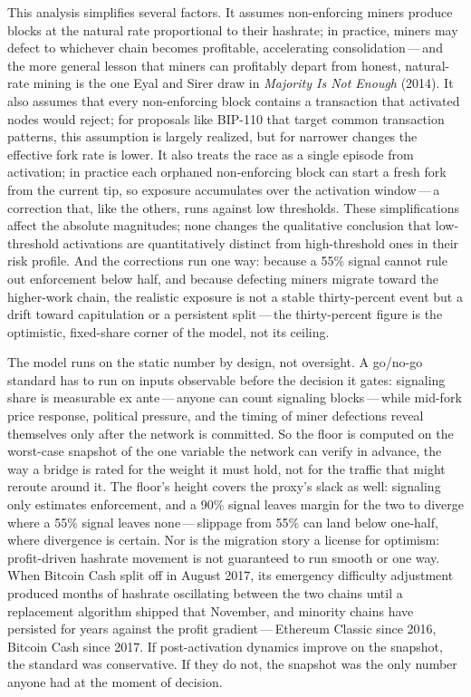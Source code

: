 \documentclass[11pt, twoside, openright]{book}
\begin{document}
This analysis simplifies several factors. It assumes non-enforcing miners produce blocks at the natural rate proportional to their hashrate; in practice, miners may defect to whichever chain becomes profitable, accelerating consolidation\,---\,and the more general lesson that miners can profitably depart from honest, natural-rate mining is the one Eyal and Sirer draw in \textit{Majority Is Not Enough} (2014). It also assumes that every non-enforcing block contains a transaction that activated nodes would reject; for proposals like BIP-110 that target common transaction patterns, this assumption is largely realized, but for narrower changes the effective fork rate is lower. It also treats the race as a single episode from activation; in practice each orphaned non-enforcing block can start a fresh fork from the current tip, so exposure accumulates over the activation window\,---\,a correction that, like the others, runs against low thresholds. These simplifications affect the absolute magnitudes; none changes the qualitative conclusion that low-threshold activations are quantitatively distinct from high-threshold ones in their risk profile. And the corrections run one way: because a 55\% signal cannot rule out enforcement below half, and because defecting miners migrate toward the higher-work chain, the realistic exposure is not a stable thirty-percent event but a drift toward capitulation or a persistent split\,---\,the thirty-percent figure is the optimistic, fixed-share corner of the model, not its ceiling.

The model runs on the static number by design, not oversight. A go/no-go standard has to run on inputs observable before the decision it gates: signaling share is measurable ex ante\,---\,anyone can count signaling blocks\,---\,while mid-fork price response, political pressure, and the timing of miner defections reveal themselves only after the network is committed. So the floor is computed on the worst-case snapshot of the one variable the network can verify in advance, the way a bridge is rated for the weight it must hold, not for the traffic that might reroute around it. The floor's height covers the proxy's slack as well: signaling only estimates enforcement, and a 90\% signal leaves margin for the two to diverge where a 55\% signal leaves none\,---\,slippage from 55\% can land below one-half, where divergence is certain. Nor is the migration story a license for optimism: profit-driven hashrate movement is not guaranteed to run smooth or one way. When Bitcoin Cash split off in August 2017, its emergency difficulty adjustment produced months of hashrate oscillating between the two chains until a replacement algorithm shipped that November, and minority chains have persisted for years against the profit gradient\,---\,Ethereum Classic since 2016, Bitcoin Cash since 2017. If post-activation dynamics improve on the snapshot, the standard was conservative. If they do not, the snapshot was the only number anyone had at the moment of decision.
\end{document}

